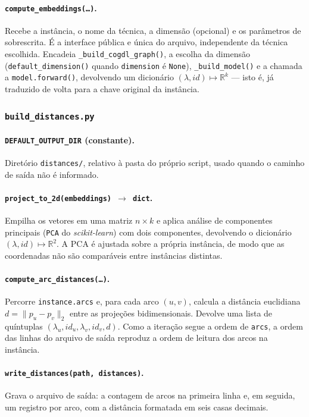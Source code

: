 \documentclass[12pt,a4paper]{article}
\begin{document}
\paragraph{\texttt{compute\_embeddings(\ldots)}.}
Recebe a instância, o nome da técnica, a dimensão (opcional) e os
parâmetros de sobrescrita. É a interface pública e única do arquivo,
independente da técnica escolhida.
Encadeia \texttt{\_build\_cogdl\_graph()}, a escolha da dimensão
(\texttt{default\_dimension()} quando \texttt{dimension} é \texttt{None}),
\texttt{\_build\_model()} e a chamada a \texttt{model.forward()},
devolvendo um dicionário $(\lambda, id) \mapsto \mathbb{R}^k$ --- isto é,
já traduzido de volta para a chave original da instância.

\subsubsection{\texttt{build\_distances.py}}

\paragraph{\texttt{DEFAULT\_OUTPUT\_DIR} (constante).}
Diretório \texttt{distances/}, relativo à pasta do próprio script, usado
quando o caminho de saída não é informado.

\paragraph{\texttt{project\_to\_2d(embeddings) $\rightarrow$ dict}.}
Empilha os vetores em uma matriz $n \times k$ e aplica análise de
componentes principais (\texttt{PCA} do \textit{scikit-learn}) com dois
componentes, devolvendo o dicionário
$(\lambda, id) \mapsto \mathbb{R}^2$. A PCA é ajustada sobre a própria
instância, de modo que as coordenadas não são comparáveis entre
instâncias distintas.

\paragraph{\texttt{compute\_arc\_distances(\ldots)}.}
Percorre \texttt{instance.arcs} e, para cada arco $(u,v)$, calcula a
distância euclidiana $d = \|p_u - p_v\|_2$ entre as projeções
bidimensionais. Devolve uma lista de quíntuplas
$(\lambda_u, id_u, \lambda_v, id_v, d)$. Como a iteração segue a ordem de
\texttt{arcs}, a ordem das linhas do arquivo de saída reproduz a ordem de
leitura dos arcos na instância.

\paragraph{\texttt{write\_distances(path, distances)}.}
Grava o arquivo de saída: a contagem de arcos na primeira linha e, em
seguida, um registro por arco, com a distância formatada em seis casas
decimais.
\end{document}
